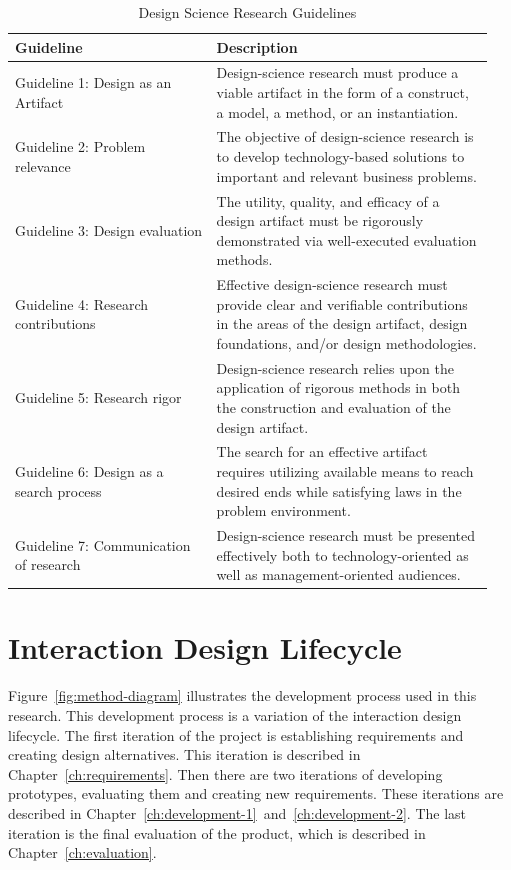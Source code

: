 \documentclass[../Main/thesis.tex]{subfiles}
\begin{document}
\begin{table}[h]
\centering
\caption[Design Science Research Guidelines]{Design Science Research Guidelines \citep[p.83]{hevner2004design}}
\begin{tabular}{|p{0.4\linewidth}|p{0.55\linewidth}|}
	\hline
	\textbf{Guideline} & \textbf{Description} \\ \hline
	Guideline 1: Design as an Artifact & Design-science research must produce a viable artifact in the form of a construct, a model, a method, or an instantiation. \\ \hline
	Guideline 2: Problem relevance & The objective of design-science research is to develop technology-based solutions to important and relevant business problems. \\ \hline
	Guideline 3: Design evaluation & The utility, quality, and efficacy of a design artifact must be rigorously demonstrated via well-executed evaluation methods. \\ \hline
	Guideline 4: Research contributions & Effective design-science research must provide clear and verifiable contributions in the areas of the design artifact, design foundations, and/or design methodologies. \\ \hline
	Guideline 5: Research rigor & Design-science research relies upon the application of rigorous methods in both the construction and evaluation of the design artifact. \\ \hline
	Guideline 6: Design as a search process & The search for an effective artifact requires utilizing available means to reach desired ends while satisfying laws in the problem environment. \\ \hline
	Guideline 7: Communication of research & Design-science research must be presented effectively both to technology-oriented as well as management-oriented audiences. \\ \hline
\end{tabular}
\label{tab:design-science-guidelines}
\end{table}

\newpage
\section{Interaction Design Lifecycle}
Figure~\ref{fig:method-diagram} illustrates the development process used in this research.
This development process is a variation of the interaction design lifecycle.
The first iteration of the project is establishing requirements and creating design alternatives.
This iteration is described in Chapter~\ref{ch:requirements}.
Then there are two iterations of developing prototypes, evaluating them and creating new requirements.
These iterations are described in Chapter~\ref{ch:development-1}~and~\ref{ch:development-2}.
The last iteration is the final evaluation of the product, which is described in Chapter~\ref{ch:evaluation}.
\newpage
\end{document}
